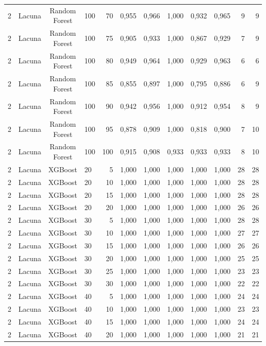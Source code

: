\begin{longtable}{ccclrrrrrrrr}
2 & Lacuna & Random Forest & 100 & 70 & 0,955 & 0,966 & 1,000 & 0,932 & 0,965 & 9 & 9 \\
2 & Lacuna & Random Forest & 100 & 75 & 0,905 & 0,933 & 1,000 & 0,867 & 0,929 & 7 & 9 \\
2 & Lacuna & Random Forest & 100 & 80 & 0,949 & 0,964 & 1,000 & 0,929 & 0,963 & 6 & 6 \\
2 & Lacuna & Random Forest & 100 & 85 & 0,855 & 0,897 & 1,000 & 0,795 & 0,886 & 6 & 9 \\
2 & Lacuna & Random Forest & 100 & 90 & 0,942 & 0,956 & 1,000 & 0,912 & 0,954 & 8 & 9 \\
2 & Lacuna & Random Forest & 100 & 95 & 0,878 & 0,909 & 1,000 & 0,818 & 0,900 & 7 & 10 \\
2 & Lacuna & Random Forest & 100 & 100 & 0,915 & 0,908 & 0,933 & 0,933 & 0,933 & 8 & 10 \\
2 & Lacuna & XGBoost & 20 & 5 & 1,000 & 1,000 & 1,000 & 1,000 & 1,000 & 28 & 28 \\
2 & Lacuna & XGBoost & 20 & 10 & 1,000 & 1,000 & 1,000 & 1,000 & 1,000 & 28 & 28 \\
2 & Lacuna & XGBoost & 20 & 15 & 1,000 & 1,000 & 1,000 & 1,000 & 1,000 & 28 & 28 \\
2 & Lacuna & XGBoost & 20 & 20 & 1,000 & 1,000 & 1,000 & 1,000 & 1,000 & 26 & 26 \\
2 & Lacuna & XGBoost & 30 & 5 & 1,000 & 1,000 & 1,000 & 1,000 & 1,000 & 28 & 28 \\
2 & Lacuna & XGBoost & 30 & 10 & 1,000 & 1,000 & 1,000 & 1,000 & 1,000 & 27 & 27 \\
2 & Lacuna & XGBoost & 30 & 15 & 1,000 & 1,000 & 1,000 & 1,000 & 1,000 & 26 & 26 \\
2 & Lacuna & XGBoost & 30 & 20 & 1,000 & 1,000 & 1,000 & 1,000 & 1,000 & 25 & 25 \\
2 & Lacuna & XGBoost & 30 & 25 & 1,000 & 1,000 & 1,000 & 1,000 & 1,000 & 23 & 23 \\
2 & Lacuna & XGBoost & 30 & 30 & 1,000 & 1,000 & 1,000 & 1,000 & 1,000 & 22 & 22 \\
2 & Lacuna & XGBoost & 40 & 5 & 1,000 & 1,000 & 1,000 & 1,000 & 1,000 & 24 & 24 \\
2 & Lacuna & XGBoost & 40 & 10 & 1,000 & 1,000 & 1,000 & 1,000 & 1,000 & 23 & 23 \\
2 & Lacuna & XGBoost & 40 & 15 & 1,000 & 1,000 & 1,000 & 1,000 & 1,000 & 24 & 24 \\
2 & Lacuna & XGBoost & 40 & 20 & 1,000 & 1,000 & 1,000 & 1,000 & 1,000 & 21 & 21 \\

\end{longtable}
